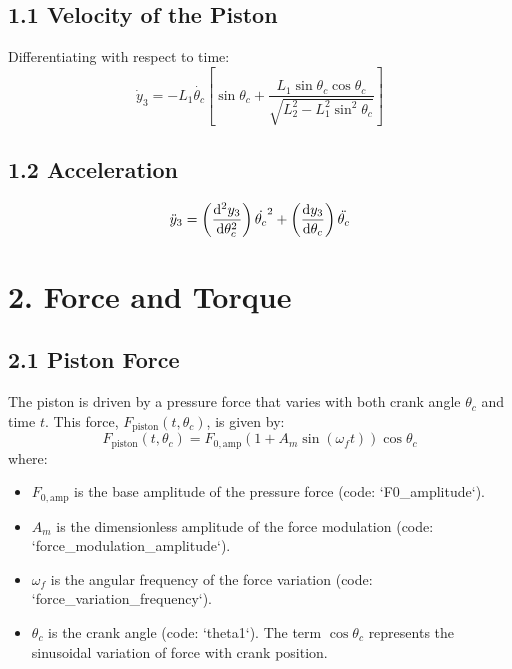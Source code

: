 \documentclass[12pt]{article}
\begin{document}
\subsection*{1.1 Velocity of the Piston}
Differentiating with respect to time:
\begin{equation}
    \dot{y}_3 = -L_1 \dot{\theta_c} \left[ \sin\theta_c + \frac{L_1 \sin\theta_c \cos\theta_c}{\sqrt{L_2^2 - L_1^2 \sin^2\theta_c}} \right]
\end{equation}

\subsection*{1.2 Acceleration}
\begin{equation}
    \ddot{y}_3 = \left( \dv[2]{y_3}{\theta_c} \right) \dot{\theta_c}^2 + \left( \dv{y_3}{\theta_c} \right) \ddot{\theta_c}
\end{equation}

\section*{2. Force and Torque}
\subsection*{2.1 Piston Force}
The piston is driven by a pressure force that varies with both crank angle \(\theta_c\) and time \(t\). This force, \(F_{\text{piston}}(t, \theta_c)\), is given by:
\begin{equation}
    F_{\text{piston}}(t, \theta_c) = F_{0,\text{amp}} (1 + A_m \sin(\omega_f t)) \cos\theta_c
\end{equation}
where:
\begin{itemize}
    \item \(F_{0,\text{amp}}\) is the base amplitude of the pressure force (code: `F0_amplitude`).
    \item \(A_m\) is the dimensionless amplitude of the force modulation (code: `force_modulation_amplitude`).
    \item \(\omega_f\) is the angular frequency of the force variation (code: `force_variation_frequency`).
    \item \(\theta_c\) is the crank angle (code: `theta1`). The term \(\cos\theta_c\) represents the sinusoidal variation of force with crank position.
\end{itemize}
\end{document}
